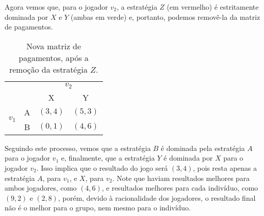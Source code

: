 Agora vemos que, para o jogador $v_2$, a estratégia $Z$ (em vermelho) é estritamente dominada por $X$ e $Y$ (ambas em verde) e, portanto, podemos removê-la da matriz de pagamentos.

\begin{table}[h]
\begin{center}
    \begin{tabular}{cccc}
        & & \multicolumn{2}{c}{$v_2$} \\
        & & X & Y \\ \cline{3-4} 
        \multirow{2}{*}{$v_1$} & \multicolumn{1}{c|}{A} & \multicolumn{1}{l|}{$(3,4)$} & \multicolumn{1}{l|}{$(5,3)$} \\ \cline{3-4}
        & \multicolumn{1}{c|}{B} & \multicolumn{1}{l|}{$(0,1)$}  & \multicolumn{1}{l|}{$(4,6)$} \\ \cline{3-4} 
    \end{tabular}
    \caption{Nova matriz de pagamentos, após a remoção da estratégia $Z$.}
    \label{mpjdi3}
\end{center}
\end{table}

Seguindo este processo, vemos que a estratégia $B$ é dominada pela estratégia $A$ para o jogador $v_1$ e, finalmente, que a estratégia $Y$ é dominada por $X$ para o jogador $v_2$. Isso implica que o resultado do jogo será $(3,4)$, pois resta apenas a estratégia $A$, para $v_1$, e $X$, para $v_2$. Note que haviam resultados melhores para ambos jogadores, como $(4,6)$, e resultados melhores para cada indivíduo, como $(9,2)$ e $(2,8)$, porém, devido à racionalidade dos jogadores, o resultado final não é o melhor para o grupo, nem mesmo para o indivíduo.

